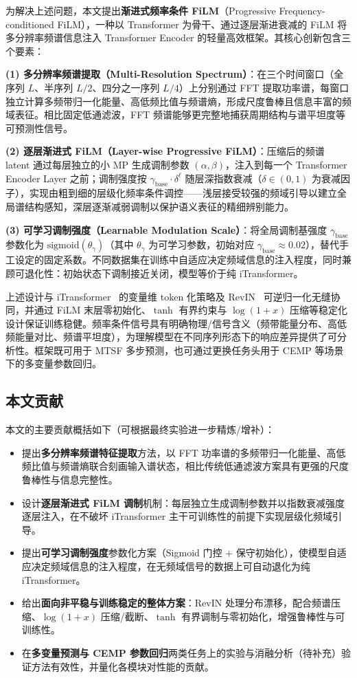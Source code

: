 为解决上述问题，本文提出\textbf{渐进式频率条件 FiLM}（Progressive Frequency-conditioned FiLM），一种以 Transformer 为骨干、通过逐层渐进衰减的 FiLM 将多分辨率频谱信息注入 Transformer Encoder 的轻量高效框架。其核心创新包含三个要素：

\textbf{(1) 多分辨率频谱提取（Multi-Resolution Spectrum）}：在三个时间窗口（全序列 \(L\)、半序列 \(L/2\)、四分之一序列 \(L/4\)）上分别通过 FFT 提取功率谱，每窗口独立计算多频带归一化能量、高低频比值与频谱熵，形成尺度鲁棒且信息丰富的频域表征。相比固定低通滤波，FFT 频谱能够更完整地捕获周期结构与谱平坦度等可预测性信号。

\textbf{(2) 逐层渐进式 FiLM（Layer-wise Progressive FiLM）}：压缩后的频谱 latent 通过每层独立的小 MP 生成调制参数 \((\alpha, \beta)\)，注入到每一个 Transformer Encoder Layer 之前；调制强度按 \(\gamma_{\text{base}} \cdot \delta^{\ell}\) 随层深指数衰减（\(\delta \in (0,1)\) 为衰减因子），实现由粗到细的层级化频率条件调控——浅层接受较强的频域引导以建立全局谱结构感知，深层逐渐减弱调制以保护语义表征的精细辨别能力。

\textbf{(3) 可学习调制强度（Learnable Modulation Scale）}：将全局调制基强度 \(\gamma_{\text{base}}\) 参数化为 \(\mathrm{sigmoid}(\theta_{\gamma})\)（其中 \(\theta_{\gamma}\) 为可学习参数，初始对应 \(\gamma_{\text{base}} \approx 0.02\)），替代手工设定的固定系数。不同数据集在训练中自适应决定频域信息的注入程度，同时兼顾可退化性：初始状态下调制接近关闭，模型等价于纯 iTransformer。

上述设计与 iTransformer~\cite{itransformer} 的变量维 token 化策略及 RevIN~\cite{revin} 可逆归一化无缝协同，并通过 FiLM 末层零初始化、\(\tanh\) 有界约束与 \(\log(1+x)\) 压缩等稳定化设计保证训练稳健。频率条件信号具有明确物理/信号含义（频带能量分布、高低频能量对比、频谱平坦度），为理解模型在不同序列形态下的响应差异提供了可分析性。框架既可用于 MTSF 多步预测，也可通过更换任务头用于 CEMP 等场景下的多变量参数回归。

\subsection{本文贡献}
\label{subsec:contributions}
本文的主要贡献概括如下（可根据最终实验进一步精炼/增补）：
\begin{itemize}
  \item 提出\textbf{多分辨率频谱特征提取}方法，以 FFT 功率谱的多频带归一化能量、高低频比值与频谱熵联合刻画输入谱状态，相比传统低通滤波方案具有更强的尺度鲁棒性与信息完整性。
  \item 设计\textbf{逐层渐进式 FiLM 调制}机制：每层独立生成调制参数并以指数衰减强度逐层注入，在不破坏 iTransformer 主干可训练性的前提下实现层级化频域引导。
  \item 提出\textbf{可学习调制强度}参数化方案（Sigmoid 门控 + 保守初始化），使模型自适应决定频域信息的注入程度，在无频域信号的数据上可自动退化为纯 iTransformer。
  \item 给出\textbf{面向非平稳与训练稳定的整体方案}：RevIN 处理分布漂移，配合频谱压缩、\(\log(1+x)\) 压缩/截断、\(\tanh\) 有界调制与零初始化，增强鲁棒性与可训练性。
  \item 在\textbf{多变量预测与 CEMP 参数回归}两类任务上的实验与消融分析（待补充）验证方法有效性，并量化各模块对性能的贡献。
\end{itemize}

